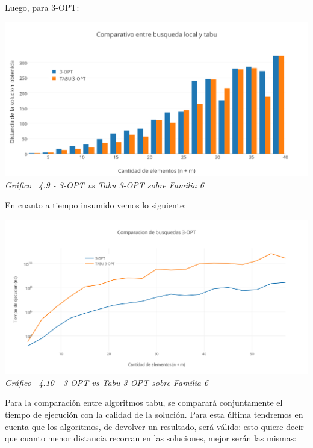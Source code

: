 Luego, para 3-OPT:

\vspace*{0.3cm} \vspace*{0.3cm}
  \begin{center}
 \includegraphics[scale=0.5]{./EJ4/comparativogym03opt.png}\\
 {            \textit{Gráfico \ 4.9 - 3-OPT vs Tabu 3-OPT sobre Familia 6}}
  \end{center}
  \vspace*{0.3cm}

En cuanto a tiempo insumido vemos lo siguiente:

\vspace*{0.3cm} \vspace*{0.3cm}
  \begin{center}
 \includegraphics[scale=0.5]{./EJ4/medicion3optsinorden.png}\\
 {            \textit{Gráfico \ 4.10 - 3-OPT vs Tabu 3-OPT sobre Familia 6}}
  \end{center}
  \vspace*{0.3cm}
  
Para la comparación entre algoritmos tabu, se comparará conjuntamente el tiempo de ejecución con la calidad de la solución. Para esta última tendremos en cuenta que los algoritmos, de devolver un resultado, será válido: esto quiere decir que cuanto menor distancia recorran en las soluciones, mejor serán las mismas:

